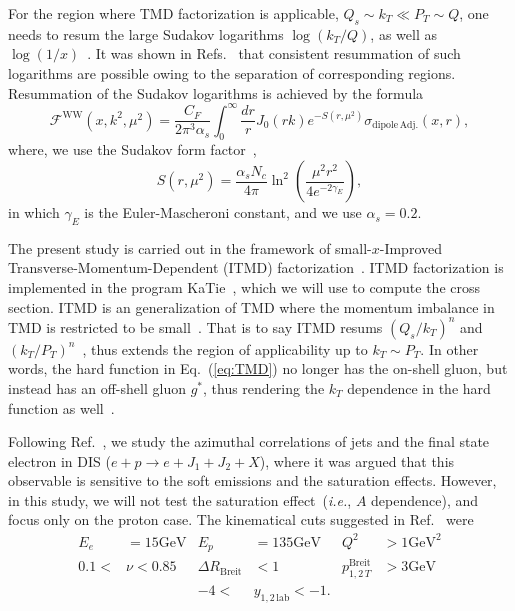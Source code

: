 \documentclass[11pt]{article}
\numberwithin{equation}{section}
\numberwithin{table}{section}
\numberwithin{figure}{section}
\newcommand{\fww}[0]{\mathcal{F}^{\mathrm{WW}}}
\newcommand{\sdpa}[0]{\sigma_{\mathrm{dipole\,Adj.}}}
\newcommand{\GeV}[0]{\mathrm{GeV}}
\newcommand{\comment}[1]{\texttt{\color{red}#1}}
\begin{document}
For the region where TMD factorization is applicable, $Q_s\sim k_T\ll P_T\sim Q$, one needs to resum the large Sudakov logarithms $\log(k_T/Q)$, as well as $\log(1/x)$~\cite{Dominguez:2011wm}. 
It was shown in Refs.~\cite{Mueller:2012uf,Mueller:2013wwa,Xiao:2017yya} that consistent resummation of such logarithms are possible owing to the separation of corresponding regions.  
Resummation of the Sudakov logarithms is achieved by the formula~\cite{Mueller:2012uf,Mueller:2013wwa,Xiao:2017yya}
\begin{equation}
	\fww(x,k^2,\mu^2)= \frac{C_F}{2\pi^3\alpha_s}\int^\infty_0\frac{dr}{r}J_0(r k) e^{-S(r,\mu^2)} \sdpa(x,r),
	\label{eq:ww-sud}
\end{equation}
where, we use the Sudakov form factor~\cite{Mueller:2013wwa,Xiao:2017yya},
\begin{equation}
	S(r,\mu^2)=\frac{\alpha_s N_c}{4\pi}\ln^2\left(\frac{\mu^2r^2}{4e^{-2\gamma_E}}\right),
\end{equation}
in which $\gamma_E$ is the Euler-Mascheroni constant, and we use $\alpha_s=0.2$. 
 

  
The present study is carried out in the framework of small-$x$-Improved Transverse-Momentum-Dependent (ITMD) factorization~\cite{Kotko:2015ura,vanHameren:2016ftb}.
ITMD factorization is implemented in the program KaTie~\cite{vanHameren:2016kkz}, which we will use to compute the cross section. 
ITMD is an generalization of TMD where the momentum imbalance in TMD is restricted to be small~\cite{Kotko:2015ura,vanHameren:2016ftb}. That is to say ITMD resums $(Q_s/k_T)^n$ and $(k_T/P_T)^n$~\cite{Kotko:2015ura,vanHameren:2016ftb}, thus extends the region of applicability up to $k_T\sim P_T$. In other words, the hard function in Eq.~(\ref{eq:TMD}) no longer has the on-shell gluon, but instead has an off-shell gluon $g^*$, thus rendering the $k_T$ dependence in the hard function as well~\cite{Kotko:2015ura}.


Following Ref.~\cite{vanHameren:2021sqc}, we study the azimuthal correlations of jets and the final state electron in DIS ($e+p\rightarrow e+J_1+J_2+X$), where it was argued that this observable is sensitive to the soft emissions and the saturation effects. However, in this study, we will not test the saturation effect~(\textit{i.e.}, $A$ dependence), and focus only on the proton case.
The kinematical cuts suggested in Ref.~\cite{vanHameren:2021sqc} were
\begin{align*}
	E_e&=15\GeV& E_p&=135\GeV& Q^2&>1\GeV^2\\
	0.1<&\nu<0.85&\Delta R_{\mathrm{Breit}}&<1&p^{\mathrm{Breit}}_{1,2\,T}&>3\GeV\\
	&&-4<&y_{1,2\,\mathrm{lab}}<-1.&&
\end{align*}
\end{document}
